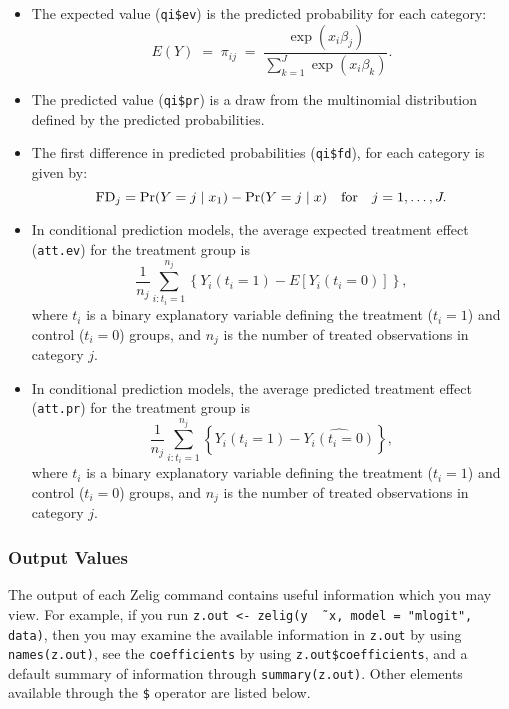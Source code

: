 \begin{itemize}
\item The expected value ({\tt qi\$ev}) is the predicted probability
  for each category:
\begin{equation*}
  E(Y) \; = \; \pi_{ij}\; = \; \frac{\exp(x_{i}\beta_{j})}{\sum^{J}_{k = 1}
      \exp(x_{i}\beta_{k})}.
\end{equation*}

\item The predicted value ({\tt qi\$pr}) is a draw from the
  multinomial distribution defined by the predicted probabilities.  

\item The first difference in predicted
  probabilities ({\tt qi\$fd}), for each category is given by:
\begin{equation*}
\textrm{FD}_j = \Pr(Y=j \mid x_1) - \Pr(Y=j \mid x) \quad {\rm for}
\quad j=1,\dots,J.
\end{equation*}

\item In conditional prediction models, the average expected treatment
  effect ({\tt att.ev}) for the treatment group is 
    \begin{equation*} \frac{1}{n_j}\sum_{i:t_i=1}^{n_j} \left\{ Y_i(t_i=1) -
      E[Y_i(t_i=0)] \right\},
    \end{equation*} 
where $t_{i}$ is a binary explanatory variable defining the treatment
($t_{i}=1$) and control ($t_{i}=0$) groups, and $n_j$ is the 
number of treated observations in category $j$.

\item In conditional prediction models, the average predicted treatment
  effect ({\tt att.pr}) for the treatment group is 
    \begin{equation*} \frac{1}{n_j}\sum_{i:t_i=1}^{n_j} \left\{ Y_i(t_i=1) -
      \widehat{Y_i(t_i=0)} \right\},
    \end{equation*} 
where $t_{i}$ is a binary explanatory variable defining the treatment
($t_{i}=1$) and control ($t_{i}=0$) groups, and $n_j$ is the 
number of treated observations in category $j$.
\end{itemize}

\subsubsection{Output Values}

The output of each Zelig command contains useful information which you
may view.  For example, if you run \texttt{z.out <- zelig(y \~\,
  x, model = "mlogit", data)}, then you may examine the available
information in \texttt{z.out} by using \texttt{names(z.out)},
see the {\tt coefficients} by using {\tt z.out\$coefficients}, and
a default summary of information through \texttt{summary(z.out)}.
Other elements available through the {\tt \$} operator are listed
below.

